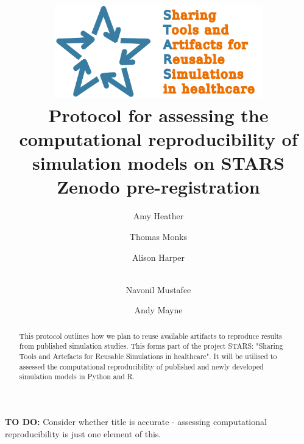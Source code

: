 \title{
    \includegraphics[width=9cm]{images/stars_pointy_v2_text2.png}\\[1cm]
    \textbf{Protocol for assessing the computational reproducibility of simulation models on STARS} \\
    \large Zenodo pre-registration
}

\author[1]{ Amy Heather}
\author[1]{ Thomas Monks}
\author[2]{ Alison Harper}
\author[2]{\\  Navonil Mustafee}
\author[3]{ Andy Mayne}


\date{}

\maketitle

\textbf{TO DO:} Consider whether title is accurate - assessing computational reproducibility is just one element of this.

\begin{shaded}
    \begin{abstract}
        This protocol outlines how we plan to reuse available artifacts to reproduce results from published simulation studies. This forms part of the project STARS: "Sharing Tools and Artefacts for Reusable Simulations in healthcare". It will be utilised to assessed the computational reproducibility of published and newly developed simulation models in Python and R.
    \end{abstract}
\end{shaded}

\vspace{0.5cm}

\newpage
\tableofcontents